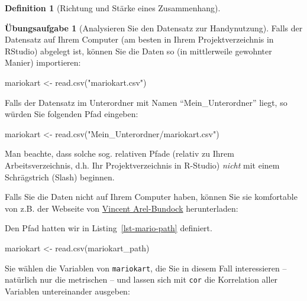 \documentclass[
  a4paper,
  DIV=11]{scrreprt}
\newenvironment{Shaded}{\begin{snugshade}}{\end{snugshade}}
\newcommand{\FunctionTok}[1]{\textcolor[rgb]{0.28,0.35,0.67}{#1}}
\newcommand{\NormalTok}[1]{\textcolor[rgb]{0.00,0.23,0.31}{#1}}
\newcommand{\OtherTok}[1]{\textcolor[rgb]{0.00,0.23,0.31}{#1}}
\newcommand{\StringTok}[1]{\textcolor[rgb]{0.13,0.47,0.30}{#1}}
\theoremstyle{definition}
\newtheorem{exercise}{Übungsaufgabe}[chapter]
\theoremstyle{definition}
\theoremstyle{definition}
\newtheorem{definition}{Definition}[chapter]
\theoremstyle{remark}
\begin{document}
\begin{definition}[Richtung und Stärke eines
Zusammenhang]
\begin{exercise}[Analysieren Sie den Datensatz zur
Handynutzung]
Falls der Datensatz auf Ihrem Computer (am besten in Ihrem
Projektverzeichnis in RStudio) abgelegt ist, können Sie die Daten so (in
mittlerweile gewohnter Manier) importieren:

\begin{Shaded}
\begin{Highlighting}[]
\NormalTok{mariokart }\OtherTok{\textless{}{-}} \FunctionTok{read.csv}\NormalTok{(}\StringTok{"mariokart.csv"}\NormalTok{)}
\end{Highlighting}
\end{Shaded}

Falls der Datensatz im Unterordner mit Namen ``Mein\_Unterordner''
liegt, so würden Sie folgenden Pfad eingeben:

\begin{Shaded}
\begin{Highlighting}[]
\NormalTok{mariokart }\OtherTok{\textless{}{-}} \FunctionTok{read.csv}\NormalTok{(}\StringTok{"Mein\_Unterordner/mariokart.csv"}\NormalTok{)}
\end{Highlighting}
\end{Shaded}

Man beachte, dass solche sog. relativen Pfade (relativ zu Ihrem
Arbeitsverzeichnis, d.h. Ihr Projektverzeichnis in R-Studio)
\emph{nicht} mit einem Schrägstrich (Slash) beginnen.

Falls Sie die Daten nicht auf Ihrem Computer haben, können Sie sie
komfortable von z.B. der Webseite von
\href{https://vincentarelbundock.github.io/Rdatasets}{Vincent
Arel-Bundock} herunterladen:

Den Pfad hatten wir in Listing~\ref{lst-mario-path} definiert.

\begin{Shaded}
\begin{Highlighting}[]
\NormalTok{mariokart }\OtherTok{\textless{}{-}} \FunctionTok{read.csv}\NormalTok{(mariokart\_path)}
\end{Highlighting}
\end{Shaded}

Sie wählen die Variablen von \texttt{mariokart}, die Sie in diesem Fall
interessieren -- natürlich nur die metrischen -- und lassen sich mit
\texttt{cor} die Korrelation aller Variablen untereinander ausgeben:


\end{exercise}
\end{definition}
\end{document}
